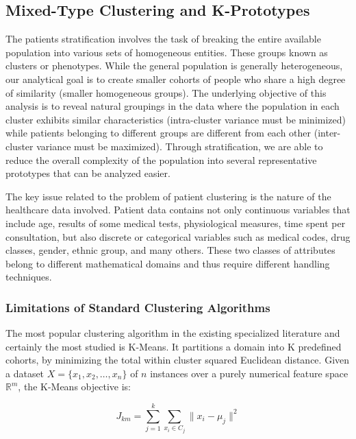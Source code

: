 \subsection{Mixed-Type Clustering and K-Prototypes}

The patients stratification involves the task of breaking the entire available population into various sets of homogeneous entities. These groups known as clusters or phenotypes. While the general population is generally heterogeneous, our analytical goal is to create smaller cohorts of people who share a high degree of similarity (smaller homogeneous groups). The underlying objective of this analysis is to reveal natural groupings in the data where the population in each cluster exhibits similar characteristics (intra-cluster variance must be minimized) while patients belonging to different groups are different from each other (inter-cluster variance must be maximized). Through stratification, we are able to reduce the overall complexity of the population into several representative prototypes that can be analyzed easier.

The key issue related to the problem of patient clustering is the nature of the healthcare data involved. Patient data contains not only continuous variables that include age, results of some medical tests, physiological measures, time spent per consultation, but also discrete or categorical variables such as medical codes, drug classes, gender, ethnic group, and many others. These two classes of attributes belong to different mathematical domains and thus require different handling techniques.

\subsubsection{Limitations of Standard Clustering Algorithms}
\label{ch:clustering_limitations}

The most popular clustering algorithm in the existing specialized literature and certainly the most studied is K-Means. It partitions a domain into K predefined cohorts, by minimizing the total within cluster squared Euclidean distance. Given a dataset $X = \{x_1, x_2, \ldots, x_n\}$ of $n$ instances over a purely numerical feature space $\mathbb{R}^m$, the K-Means objective is:

\begin{equation}
    J_{km} = \sum_{j=1}^{k} \sum_{x_i \in C_j} \|x_i - \mu_j\|^2
    \label{eq:kmeans}
\end{equation}

